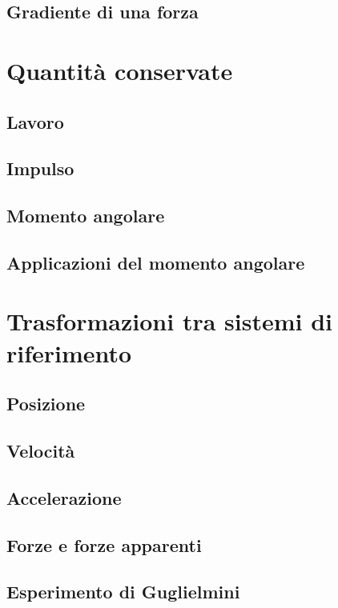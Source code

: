 \documentclass[a4paper]{article}
\begin{document}
\subsection{Gradiente di una forza}

\section{Quantità conservate}
\subsection{Lavoro}
\subsection{Impulso}
\subsection{Momento angolare}
\subsection{Applicazioni del momento angolare}

\section{Trasformazioni tra sistemi di riferimento}
\subsection{Posizione}
\subsection{Velocità}
\subsection{Accelerazione}
\subsection{Forze e forze apparenti}
\subsection{Esperimento di Guglielmini}
\end{document}
